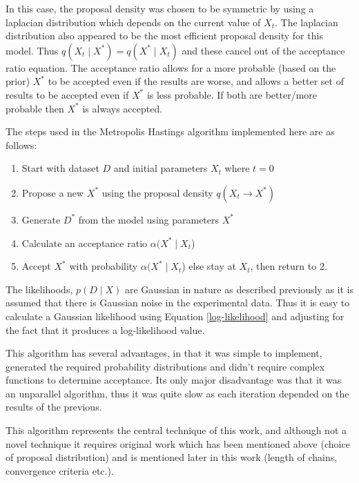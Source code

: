 In this case, the proposal density was chosen to be symmetric by using a laplacian distribution which depends on the current value of $X_t$. The laplacian distribution also appeared to be the most efficient proposal density for this model. Thus $q(X_t \mid{} X^{*}) = q(X^{*} \mid{} X_t)$ and these cancel out of the acceptance ratio equation. The acceptance ratio allows for a more probable (based on the prior) $X^*$ to be accepted even if the results are worse, and allows a better set of results to be accepted even if $X^*$ is less probable. If both are better/more probable then $X^*$ is always accepted.

The steps used in the Metropolis Hastings algorithm implemented here are as follows:
\begin{enumerate}
\item Start with dataset $D$ and initial parameters $X_t$ where $t=0$

\item Propose a new $X^*$ using the proposal density $q(X_t \rightarrow X^{*})$

\item Generate $D^*$ from the model using parameters $X^*$

\item Calculate an acceptance ratio $\alpha(X^*\mid{}X_t$)

\item Accept $X^*$ with probability $\alpha(X^*\mid{}X_t$) else stay at $X_t$, then return to 2.

\end{enumerate}

The likelihoods, $p(D\mid{}X)$ are Gaussian in nature as described previously as it is assumed that there is Gaussian noise in the experimental data. Thus it is easy to calculate a Gaussian likelihood using Equation \ref{log-likelihood} and adjusting for the fact that it produces a log-likelihood value.

This algorithm has several advantages, in that it was simple to implement, generated the required probability distributions and didn't require complex functions to determine acceptance. Its only major disadvantage was that it was an unparallel algorithm, thus it was quite slow as each iteration depended on the results of the previous.

This algorithm represents the central technique of this work, and although not a novel technique it requires original work which has been mentioned above (choice of proposal distribution) and is mentioned later in this work (length of chains, convergence criteria etc.).

